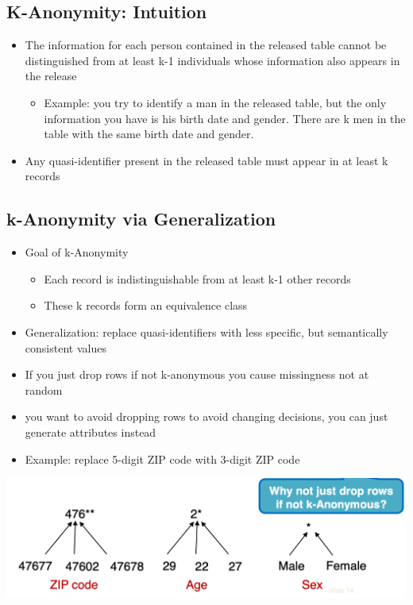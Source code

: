 \documentclass[11pt]{article}
\theoremstyle{definition}
\begin{document}
\subsection{K-Anonymity: Intuition}
\begin{itemize}
    \item The information for each person contained in the released table cannot be distinguished from at least k-1 individuals whose information also appears in the release
    \begin{itemize}
        \item Example: you try to identify a man in the released table, but the only information you have is his birth date and gender. There are k men in the table with the same birth date and gender.
    \end{itemize}
    \item Any quasi-identifier present in the released table must appear in at least k records
\end{itemize}

\subsection{k-Anonymity via Generalization}
\begin{itemize}
    \item Goal of k-Anonymity
    \begin{itemize}
        \item Each record is indistinguishable from at least k-1 other records
        \item These k records form an equivalence class
    \end{itemize}
    \item Generalization: replace quasi-identifiers with less specific, but semantically consistent values
    \item If you just drop rows if not k-anonymous you cause missingness not at random
    \item you want to avoid dropping rows to avoid changing decisions, you can just generate attributes instead
    \item Example: replace 5-digit ZIP code with 3-digit ZIP code
\end{itemize}
\includegraphics[width=\textwidth/2]{17.png}
\end{document}
